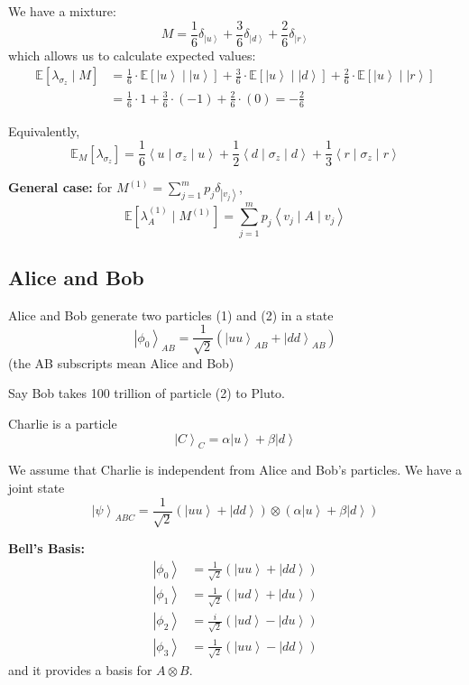 \documentclass[12pt]{article}
\newcommand{\brak}[1]{\left\langle #1 \right\rangle}
\newcommand{\ket}[1]{\left\vert #1 \right\rangle}
\newcommand{\E}{\mathbb{E}}
\begin{document}
        We have a mixture:
        \[M = \frac{1}{6}\delta_{\ket u} + \frac{3}{6}\delta_{\ket d} + \frac{2}{6}\delta_{\ket r}\] 
        which allows us to calculate expected values:
        \begin{align*}
            \E[\lambda_{\sigma_z} \; | \; M] &= \frac{1}{6}\cdot \E[\ket{u} \; | \; \ket{u}] + \frac{3}{6}\cdot \E[\ket{u} \; | \; \ket{d}] + \frac{2}{6}\cdot \E[\ket{u} \; | \; \ket{r}]\\
            &= \frac{1}{6}\cdot 1 + \frac{3}{6}\cdot (-1) + \frac{2}{6}\cdot (0) = -\frac{2}{6}
        \end{align*}

        Equivalently, 
        \[\E_M[\lambda_{\sigma_z}] = \frac{1}{6}\brak{u \; | \; \sigma_z \; | \; u} + \frac{1}{2}\brak{d \; | \; \sigma_z \; | \; d} + \frac{1}{3}\brak{r \; | \; \sigma_z \; | \; r}\]

        \textbf{General case:} for $M^{(1)} = \sum_{j=1}^m p_j \delta_{\ket{v_j}}$, 
        \[\E[\lambda_A^{(1)} \; | \; M^{(1)}] = \sum_{j=1}^m p_j \brak{v_j \; | \; A \; | \; v_j}\]

    \subsection*{Alice and Bob}
        Alice and Bob generate two particles (1) and (2) in a state 
        \[\ket{\phi_0}_{AB} = \frac{1}{\sqrt 2}(\ket{uu}_{AB} + \ket{dd}_{AB})\]
        (the AB subscripts mean Alice and Bob) 

        Say Bob takes 100 trillion of particle (2) to Pluto. 

        Charlie is a particle
        \[\ket{C}_C = \alpha \ket{u} + \beta\ket{d}\]

        We assume that Charlie is independent from Alice and Bob's particles. We have a joint state
        \[\ket{\psi}_{ABC} = \frac{1}{\sqrt 2}(\ket{uu} + \ket{dd}) \otimes (\alpha\ket{u} + \beta \ket{d})\]

        \textbf{Bell's Basis:} 
        \begin{align*}
            \ket{\phi_0} &= \frac{1}{\sqrt 2}(\ket{uu} + \ket{dd})\\
            \ket{\phi_1} &= \frac{1}{\sqrt 2}(\ket{ud} + \ket{du})\\
            \ket{\phi_2} &= \frac{i}{\sqrt 2}(\ket{ud} - \ket{du})\\
            \ket{\phi_3} &= \frac{1}{\sqrt 2}(\ket{uu} - \ket{dd})
        \end{align*}
        and it provides a basis for $A\otimes B$. 
\end{document}
